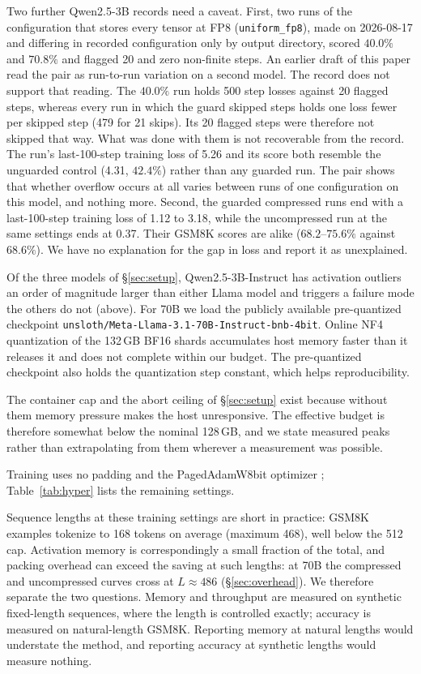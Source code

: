 \documentclass[11pt,letterpaper]{article}
\begin{document}
Two further Qwen2.5-3B records need a caveat. First, two runs of the configuration that stores every tensor at FP8 (\texttt{uniform\_fp8}), made on 2026-08-17 and differing in recorded configuration only by output directory, scored $40.0\%$ and $70.8\%$ and flagged 20 and zero non-finite steps. An earlier draft of this paper read the pair as run-to-run variation on a second model. The record does not support that reading. The $40.0\%$ run holds 500 step losses against 20 flagged steps, whereas every run in which the guard skipped steps holds one loss fewer per skipped step (479 for 21 skips). Its 20 flagged steps were therefore not skipped that way. What was done with them is not recoverable from the record. The run's last-100-step training loss of 5.26 and its score both resemble the unguarded control (4.31, $42.4\%$) rather than any guarded run. The pair shows that whether overflow occurs at all varies between runs of one configuration on this model, and nothing more. Second, the guarded compressed runs end with a last-100-step training loss of 1.12 to 3.18, while the uncompressed run at the same settings ends at 0.37. Their GSM8K scores are alike ($68.2$--$75.6\%$ against $68.6\%$). We have no explanation for the gap in loss and report it as unexplained.

\medskip
Of the three models of \S\ref{sec:setup}, Qwen2.5-3B-Instruct has activation outliers an order of magnitude larger than either Llama model and triggers a failure mode the others do not (above). For 70B we load the publicly available pre-quantized checkpoint \texttt{unsloth/\allowbreak Meta-Llama-3.1-\allowbreak 70B-Instruct-\allowbreak bnb-4bit}. Online NF4 quantization of the 132\,GB BF16 shards accumulates host memory faster than it releases it and does not complete within our budget. The pre-quantized checkpoint also holds the quantization step constant, which helps reproducibility.


The container cap and the abort ceiling of \S\ref{sec:setup} exist because without them memory pressure makes the host unresponsive. The effective budget is therefore somewhat below the nominal 128\,GB, and we state measured peaks rather than extrapolating from them wherever a measurement was possible.

Training uses no padding and the PagedAdamW8bit optimizer \citep{dettmers2023qlora}; Table~\ref{tab:hyper} lists the remaining settings.

Sequence lengths at these training settings are short in practice: GSM8K examples tokenize to 168 tokens on average (maximum 468), well below the 512 cap. Activation memory is correspondingly a small fraction of the total, and packing overhead can exceed the saving at such lengths: at 70B the compressed and uncompressed curves cross at $L \approx 486$ (\S\ref{sec:overhead}). We therefore separate the two questions. Memory and throughput are measured on synthetic fixed-length sequences, where the length is controlled exactly; accuracy is measured on natural-length GSM8K. Reporting memory at natural lengths would understate the method, and reporting accuracy at synthetic lengths would measure nothing.
\end{document}
